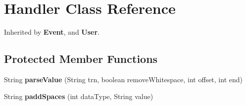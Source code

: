 \section{Handler Class Reference}
\label{class_handler}


Inherited by \textbf{ Event}, and \textbf{ User}.

\subsection*{Protected Member Functions}
\begin{DoxyCompactItemize}
\item 
String \textbf{ parse\+Value} (String trn, boolean remove\+Whitespace, int offset, int end)
\item 
String \textbf{ padd\+Spaces} (int data\+Type, String value)
\end{DoxyCompactItemize}
